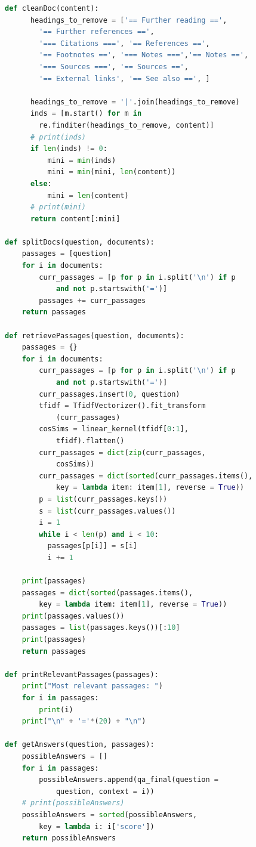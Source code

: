 \documentclass[12pt, a4paper]{article}
\begin{document}
\begin{lstlisting}[language = Python]
def cleanDoc(content):
      headings_to_remove = ['== Further reading ==', 
        '== Further references ==', 
        '=== Citations ===', '== References ==', 
        '== Footnotes ==', '=== Notes ===','== Notes ==', 
        '=== Sources ===', '== Sources ==', 
        '== External links', '== See also ==', ]
      
      headings_to_remove = '|'.join(headings_to_remove) 
      inds = [m.start() for m in 
        re.finditer(headings_to_remove, content)]
      # print(inds) 
      if len(inds) != 0: 
          mini = min(inds) 
          mini = min(mini, len(content)) 
      else: 
          mini = len(content)
      # print(mini)
      return content[:mini]

def splitDocs(question, documents): 
    passages = [question]
    for i in documents: 
        curr_passages = [p for p in i.split('\n') if p 
            and not p.startswith('=')] 
        passages += curr_passages 
    return passages

def retrievePassages(question, documents): 
    passages = {}
    for i in documents: 
        curr_passages = [p for p in i.split('\n') if p 
            and not p.startswith('=')] 
        curr_passages.insert(0, question) 
        tfidf = TfidfVectorizer().fit_transform
            (curr_passages) 
        cosSims = linear_kernel(tfidf[0:1], 
            tfidf).flatten() 
        curr_passages = dict(zip(curr_passages, 
            cosSims)) 
        curr_passages = dict(sorted(curr_passages.items(), 
            key = lambda item: item[1], reverse = True)) 
        p = list(curr_passages.keys()) 
        s = list(curr_passages.values()) 
        i = 1 
        while i < len(p) and i < 10: 
          passages[p[i]] = s[i] 
          i += 1

    print(passages) 
    passages = dict(sorted(passages.items(), 
        key = lambda item: item[1], reverse = True)) 
    print(passages.values())
    passages = list(passages.keys())[:10] 
    print(passages) 
    return passages

def printRelevantPassages(passages): 
    print("Most relevant passages: ")
    for i in passages: 
        print(i) 
    print("\n" + '='*(20) + "\n")

def getAnswers(question, passages): 
    possibleAnswers = []
    for i in passages: 
        possibleAnswers.append(qa_final(question = 
            question, context = i)) 
    # print(possibleAnswers) 
    possibleAnswers = sorted(possibleAnswers, 
        key = lambda i: i['score']) 
    return possibleAnswers


\end{lstlisting}
\end{document}
